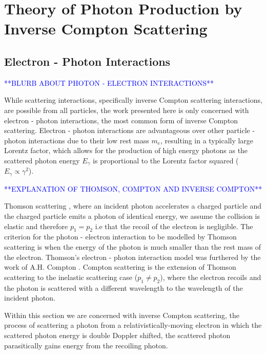 \documentclass[../main.tex]{subfiles}
\begin{document}
\chapter{Theory of Photon Production by Inverse Compton Scattering}
\label{Theory_of_Photon_Production_by_Inverse_Compton_Scattering} %

\section{Electron - Photon Interactions}
\label{sec:electron_photon_interactions}
\textcolor{blue}{**BLURB ABOUT PHOTON - ELECTRON INTERACTIONS**}

While scattering interactions, specifically inverse Compton scattering interactions, are possible from all particles, the work presented here is only concerned with electron - photon interactions, the most common form of inverse Compton scattering.  Electron - photon interactions are advantageous over other particle - photon interactions due to their low rest mass $m_{e}$, resulting in a typically large Lorentz factor, which allows for the production of high energy photons as the scattered photon energy $E_{\gamma}$ is proportional to the Lorentz factor squared ($E_{\gamma}\propto\gamma^{2}$).    

\textcolor{blue}{**EXPLANATION OF THOMSON, COMPTON AND INVERSE COMPTON**}

Thomson scattering \cite{thomson1904xxxiv}, where an incident photon accelerates a charged particle and the charged particle emits a photon of identical energy, we assume the collision is elastic and therefore $p_{1} = p_{2}$ i.e that the recoil of the electron is negligible. The criterion for the photon - electron interaction to be modelled by Thomson scattering is when the energy of the photon is much smaller than the rest mass of the electron. Thomson's electron - photon interaction model was furthered by the work of A.H. Compton \cite{compton1923quantum}. Compton scattering is the extension of Thomson scattering to the inelastic scattering case ($p_{1} \neq p_{2}$), where the electron recoils and the photon is scattered with a different wavelength to the wavelength of the incident photon.

Within this section we are concerned with inverse Compton scattering, the process of scattering a photon from a relativistically-moving  electron in which the scattered photon energy is double Doppler shifted, the scattered photon parasitically gains energy from the recoiling photon.  
\end{document}
